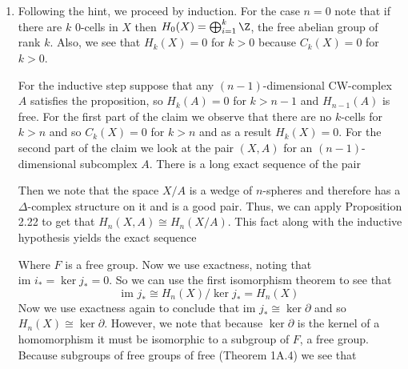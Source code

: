 \documentclass{article}
\newcommand{\im}{\text{im }}
\begin{document}
\begin{solution}{\parindent}
  \begin{enumerate}
  \item Following the hint, we proceed by induction. For the case
    $n=0$ note that if there are $k$ 0-cells in $X$ then $H_0(X) =
    \bigoplus_{i=1}^k \Z$, the free abelian group of rank $k$. Also,
    we see that $H_k(X) = 0$ for $k > 0$ because $C_k(X) = 0$ for $k >
    0$.

    For the inductive step suppose that any $(n-1)$-dimensional
    CW-complex $A$ satisfies the proposition, so $H_k(A) = 0$ for $k >
    n-1$ and $H_{n-1}(A)$ is free. For the first part of the claim we
    observe that there are no $k$-cells for $k > n$ and so $C_k(X) =
    0$ for $k > n$ and as a result $H_k(X) = 0$. For the second part
    of the claim we look at the pair $(X,A)$ for an
    $(n-1)$-dimensional subcomplex $A$. There is a long exact sequence
    of the pair
    \begin{center}
    \end{center}
    Then we note that the space $X/A$ is a wedge of $n$-spheres and
    therefore has a $\Delta$-complex structure on it and is a good
    pair. Thus, we can apply Proposition 2.22 to get that $H_n(X,A)
    \cong H_n(X/A)$. This fact along with the inductive hypothesis
    yields the exact sequence
    \begin{center}
    \end{center}
    Where $F$ is a free group. Now we use exactness, noting that $\im
    i_\ast = \ker j_\ast = 0$. So we can use the first isomorphism
    theorem to see that
    \[
    \im j_\ast \cong H_n(X)/\ker j_\ast = H_n(X)
    \]
    Now we use exactness again to conclude that $\im j_\ast \cong
    \ker \partial$ and so $H_n(X) \cong \ker \partial$. However, we
    note that because $\ker \partial$ is the kernel of a homomorphism
    it must be isomorphic to a subgroup of $F$, a free group. Because
    subgroups of free groups of free (Theorem 1A.4) we see that

\end{enumerate}
\end{solution}
\end{document}
